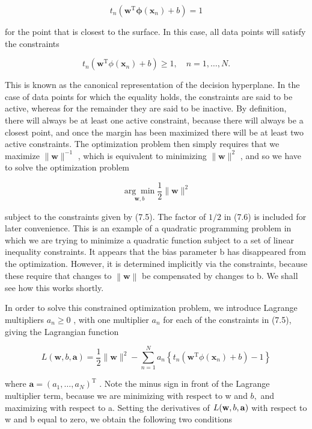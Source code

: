 \documentclass[
  10
]{article}
\begin{document}
\[
t _ {n} \left(\mathbf {w} ^ {\mathrm{T}} \boldsymbol {\phi} (\mathbf {x} _ {n}) + b\right) = 1\tag{7.4}
\]

for the point that is closest to the surface. In this case, all data
points will satisfy the constraints

\[
t _ {n} \left(\mathbf {w} ^ {\mathrm{T}} \phi (\mathbf {x} _ {n}) + b\right) \geqslant 1, \quad n = 1, \dots , N.\tag{7.5}
\]

This is known as the canonical representation of the decision
hyperplane. In the case of data points for which the equality holds, the
constraints are said to be active, whereas for the remainder they are
said to be inactive. By definition, there will always be at least one
active constraint, because there will always be a closest point, and
once the margin has been maximized there will be at least two active
constraints. The optimization problem then simply requires that we
maximize \(\lVert \mathbf { w } \rVert ^ { - 1 }\) , which is equivalent
to minimizing \(\| \mathbf { w } \| ^ { 2 }\) , and so we have to solve
the optimization problem

\[
\underset {\mathbf {w}, b} {\arg \min} \frac {1}{2} \| \mathbf {w} \| ^ {2}\tag{7.6}
\]

subject to the constraints given by (7.5). The factor of \(1 / 2\) in
(7.6) is included for later convenience. This is an example of a
quadratic programming problem in which we are trying to minimize a
quadratic function subject to a set of linear inequality constraints. It
appears that the bias parameter b has disappeared from the optimization.
However, it is determined implicitly via the constraints, because these
require that changes to \(\left\| \mathbf { w } \right\|\) be
compensated by changes to b. We shall see how this works shortly.

In order to solve this constrained optimization problem, we introduce
Lagrange multipliers \(a _ { n } \geqslant 0\) , with one multiplier
\(a _ { n }\) for each of the constraints in (7.5), giving the
Lagrangian function

\[
L (\mathbf {w}, b, \mathbf {a}) = \frac {1}{2} \| \mathbf {w} \| ^ {2} - \sum_ {n = 1} ^ {N} a _ {n} \left\{t _ {n} \left(\mathbf {w} ^ {\mathrm{T}} \phi \left(\mathbf {x} _ {n}\right) + b\right) - 1 \right\}\tag{7.7}
\]

where
\(\mathbf { a } = ( a _ { 1 } , \ldots , a _ { N } ) ^ { \mathrm { T } }\)
. Note the minus sign in front of the Lagrange multiplier term, because
we are minimizing with respect to w and \(b ,\) and maximizing with
respect to a. Setting the derivatives of
\(L ( { \bf w } , b , { \bf a } )\) with respect to w and b equal to
zero, we obtain the following two conditions
\end{document}
